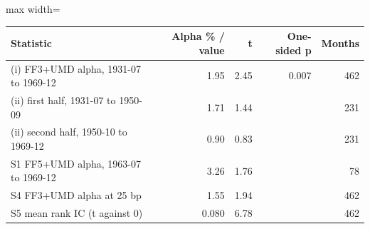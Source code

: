 \begin{adjustbox}{max width=\linewidth}
\begin{tabular}{lrrrr}
\toprule
Statistic & Alpha \% / value & t & One-sided p & Months \\
\midrule
(i) FF3+UMD alpha, 1931-07 to 1969-12 & 1.95 & 2.45 & 0.007 & 462 \\
(ii) first half, 1931-07 to 1950-09 & 1.71 & 1.44 &  & 231 \\
(ii) second half, 1950-10 to 1969-12 & 0.90 & 0.83 &  & 231 \\
S1 FF5+UMD alpha, 1963-07 to 1969-12 & 3.26 & 1.76 &  & 78 \\
S4 FF3+UMD alpha at 25 bp & 1.55 & 1.94 &  & 462 \\
S5 mean rank IC (t against 0) & 0.080 & 6.78 &  & 462 \\
\bottomrule
\end{tabular}
\end{adjustbox}
\par{}
